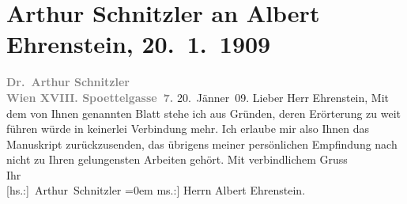 

         
         \renewcommand{\erwaehntePersonen}{Personen: Albert Ehrenstein}
         \renewcommand{\erwaehnteInstitutionen}{Institutionen: Österreichische Rundschau}
         \renewcommand{\erwaehnteOrte}{Orte: Edmund-Weiß-Gasse, Wien}
         \renewcommand{\erwaehnteWerke}{Werke: Tai-Gin}
               \section[Arthur Schnitzler an Albert Ehrenstein, 20. 1. 1909]{ Arthur Schnitzler an Albert Ehrenstein, 20. 1. 1909}\nopagebreak{}\rehead{ }\begin{ledgroupsized}[t]{13cm}\normalsize\beginnumbering{} \toendnotes[C]{\smallbreak\pagebreak[2]} 
\toendnotes[C]{\smallbreak}\pstart
           \noindent{}{\pb}\textcolor{gray}{\textbf{Dr. Arthur Schnitzler}}{\\}\textcolor{gray}{\textbf{Wien XVIII. Spoettelgasse 7.}}\pend
           \pstart
           \raggedleft{}20. Jänner 09.\pend
           \pstart{}Lieber Herr Ehrenstein,\pend\pstart
           Mit dem von Ihnen genannten Blatt stehe ich aus Gründen, deren Erörterung zu weit führen würde in
               keinerlei Verbindung mehr. Ich erlaube mir also Ihnen das Manuskript zurückzusenden, das übrigens
               meiner persönlichen Empfindung nach nicht zu Ihren gelungensten Arbeiten gehört.\pend
           \pstart
           Mit verbindlichem Gruss{\\[\baselineskip]} Ihr{\\[\baselineskip]}\spacefill\mbox{{[}hs.:{]} Arthur Schnitzler}\pend
           \leftskip=0em{}\pstart
           \noindent{}{[}ms.:{]} Herrn Albert Ehrenstein.\pend
           
         
         \endnumbering{}\end{ledgroupsized}  \newcommand{\dateiname}{L01825}\newcommand{\titel}{Arthur Schnitzler an Albert Ehrenstein, 20. 1. 1909}\newcommand{\editorInnen}{Martin Anton Müller und Gerd-Hermann Susen}
      